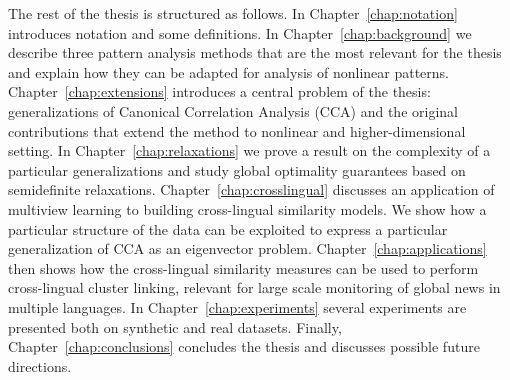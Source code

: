The rest of the thesis is structured as follows. In Chapter~\ref{chap:notation} introduces notation and some
definitions. In Chapter~\ref{chap:background} we describe three pattern analysis methods that are the most relevant
for the thesis and explain how they can be adapted for analysis of nonlinear patterns. Chapter~\ref{chap:extensions} 
introduces a central problem of the thesis: generalizations of Canonical Correlation Analysis (CCA) and the original
contributions that extend the method to nonlinear and higher-dimensional setting. In Chapter~\ref{chap:relaxations} 
we prove a result on the complexity of a particular generalizations and study global optimality guarantees based
on semidefinite relaxations. Chapter~\ref{chap:crosslingual} discusses an application of multiview learning
to building cross-lingual similarity models. We show how a particular structure of the data can be exploited
to express a particular generalization of CCA as an eigenvector problem. Chapter~\ref{chap:applications} then
shows how the cross-lingual similarity measures can be used to perform cross-lingual cluster linking, relevant
for large scale monitoring of global news in multiple languages. In Chapter~\ref{chap:experiments} several experiments
are presented both on synthetic and real datasets. Finally, Chapter~\ref{chap:conclusions} concludes the thesis 
and discusses possible future directions.
